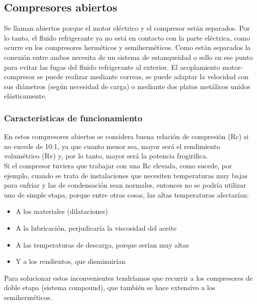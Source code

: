 \subsection{Compresores abiertos}
Se llaman abiertos porque el motor el\'ectrico y el compresor est\'an separados. Por lo tanto, el fluido refrigerante ya no est\'a en contacto con la parte el\'ectrica, como ocurre en los compresores herm\'eticos y semiherm\'eticos. Como est\'an separados la conexi\'on entre ambos necesita de un sistema de estanqueidad o sello en ese punto para evitar las fugas del fluido refrigerante al exterior. El acoplamiento motor-compresor se puede realizar mediante correas, se puede adaptar la velocidad con sus di\'ametros (seg\'un necesidad de carga) o mediante dos platos met\'alicos unidos el\'asticamente.
\subsubsection{Caracter\'isticas de funcionamiento}
En estos compresores abiertos se considera buena relaci\'on de compresi\'on (Rc) si no excede de 10:1, ya que cuanto menor sea, mayor ser\'a el rendimiento volum\'etrico (Rv) y, por lo tanto, mayor ser\'a la potencia frogir\'ifica.\\ Si el compresor tuviera que trabajar con una Rc elevada, como sucede, por ejemplo, cuando se trata de instalaciones que necesiten temperaturas muy bajas para enfriar y las de condensaci\'on sean normales, entonces no se podr\'ia utilizar uno de simple etapa, porque entre otras cosas, las altas temperaturas afectar\'ian:
\begin{itemize}
	\item A los materiales (dilataciones)
	\item A la lubricaci\'on, perjudicar\'ia la viscosidad del aceite
	\item A las temperaturas de descarga, porque ser\'ian muy altas
	\item Y a los rendientos, que disminuir\'ian
\end{itemize}
Para solucionar estos inconvenientes tendr\'iamos que recurrir a los compresores de doble etapa (sistema compound), que tambi\'en se hace extensivo a los semiherm\'eticos.
